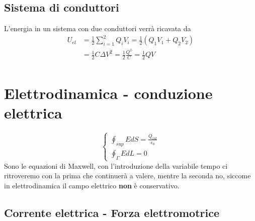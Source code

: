 \documentclass[a4paper, 12pt]{book}
\theoremstyle{plain}
\begin{document}
\section{Sistema di conduttori}

L'energia in un sistema con due conduttori verrà ricavata da 
\[
    \begin{split}
        U_{el} &= \frac{1}{2} \sum_{i=1}^2 Q_i V_i =  \frac{1}{2} (Q_1 V_1 + Q_2 V_2) \\
        &= \frac{1}{2} C \Delta V^2 = \frac{1}{2} \frac{Q^2}{C} = \frac{1}{2} QV \\
    \end{split}
\]

\chapter{Elettrodinamica - conduzione elettrica}

\[
    \begin{cases}
        \oint_{sup} EdS = \frac{Q_{int}}{\epsilon_0} \\
        \oint_{\Gamma} EdL = 0
    \end{cases}
\]
Sono le equazioni di Maxwell, con l'introduzione della 
variabile tempo ci ritroveremo con la prima che continuerà 
a valere, mentre la seconda no, siccome in elettrodinamica
il campo elettrico \textbf{non} è conservativo.

\section{Corrente elettrica - Forza elettromotrice}
\end{document}
